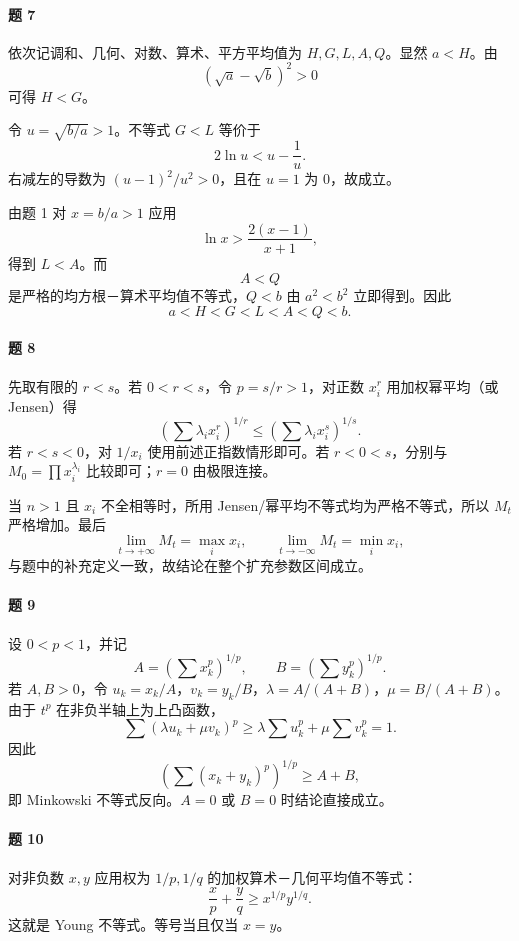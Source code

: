 \paragraph{题 7}
\begin{xsolution}
依次记调和、几何、对数、算术、平方平均值为 $H,G,L,A,Q$。显然 $a<H$。由
\[
  (\sqrt a-\sqrt b)^2>0
\]
可得 $H<G$。

令 $u=\sqrt{b/a}>1$。不等式 $G<L$ 等价于
\[
  2\ln u<u-\frac1u.
\]
右减左的导数为 $(u-1)^2/u^2>0$，且在 $u=1$ 为 0，故成立。

由题 1 对 $x=b/a>1$ 应用
\[
  \ln x>\frac{2(x-1)}{x+1},
\]
得到 $L<A$。而
\[
  A<Q
\]
是严格的均方根－算术平均值不等式，$Q<b$ 由 $a^2<b^2$ 立即得到。因此
\[
  a<H<G<L<A<Q<b.
\]
\end{xsolution}

\paragraph{题 8}
\begin{xsolution}
先取有限的 $r<s$。若 $0<r<s$，令 $p=s/r>1$，对正数 $x_i^r$ 用加权幂平均（或 Jensen）得
\[
  \left(\sum\lambda_i x_i^r\right)^{1/r}
  \le
  \left(\sum\lambda_i x_i^s\right)^{1/s}.
\]
若 $r<s<0$，对 $1/x_i$ 使用前述正指数情形即可。若 $r<0<s$，分别与 $M_0=\prod x_i^{\lambda_i}$ 比较即可；$r=0$ 由极限连接。

当 $n>1$ 且 $x_i$ 不全相等时，所用 Jensen/幂平均不等式均为严格不等式，所以 $M_t$ 严格增加。最后
\[
  \lim_{t\to+\infty}M_t=\max_i x_i,
  \qquad
  \lim_{t\to-\infty}M_t=\min_i x_i,
\]
与题中的补充定义一致，故结论在整个扩充参数区间成立。
\end{xsolution}

\paragraph{题 9}
\begin{xsolution}
设 $0<p<1$，并记
\[
  A=\left(\sum x_k^p\right)^{1/p},
  \qquad
  B=\left(\sum y_k^p\right)^{1/p}.
\]
若 $A,B>0$，令 $u_k=x_k/A$，$v_k=y_k/B$，$\lambda=A/(A+B)$，$\mu=B/(A+B)$。由于 $t^p$ 在非负半轴上为上凸函数，
\[
  \sum(\lambda u_k+\mu v_k)^p
  \ge\lambda\sum u_k^p+\mu\sum v_k^p=1.
\]
因此
\[
  \left(\sum(x_k+y_k)^p\right)^{1/p}\ge A+B,
\]
即 Minkowski 不等式反向。$A=0$ 或 $B=0$ 时结论直接成立。
\end{xsolution}

\paragraph{题 10}
\begin{xsolution}
对非负数 $x,y$ 应用权为 $1/p,1/q$ 的加权算术－几何平均值不等式：
\[
  \frac xp+\frac yq
  \ge x^{1/p}y^{1/q}.
\]
这就是 Young 不等式。等号当且仅当 $x=y$。
\end{xsolution}

